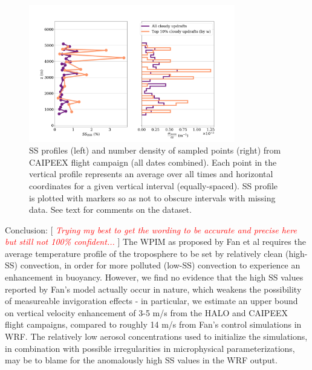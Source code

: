 \documentclass{article}
\newcommand{\klcomm}[1]{\textcolor{red}{\textit{#1}}}
\begin{document}

\begin{figure}[ht]
    \centering
    \includegraphics[width=9cm]{revcaipeex/v1_FINAL_combined_bipanel_ss_qss_vs_z_figure.png}
    \caption{SS profiles (left) and number density of sampled points (right) from CAIPEEX flight campaign (all dates combined). Each point in the vertical profile represents an average over all times and horizontal coordinates for a given vertical interval (equally-spaced). SS profile is plotted with markers so as not to obscure intervals with missing data. See text for comments on the dataset.}
    \label{caipeexbipanel}
\end{figure}

Conclusion: [ \klcomm{Trying my best to get the wording to be accurate and precise here but still not 100\% confident...} ] The WPIM as proposed by Fan et al requires the average temperature profile of the troposphere to be set by relatively clean (high-SS) convection, in order for more polluted (low-SS) convection to experience an enhancement in buoyancy. However, we find no evidence that the high SS values reported by Fan's model actually occur in nature, which weakens the possibility of measureable invigoration effects - in particular, we estimate an upper bound on vertical velocity enhancement of 3-5 m/s from the HALO and CAIPEEX flight campaigns, compared to roughly 14 m/s from Fan's control simulations in WRF. The relatively low aerosol concentrations used to initialize the simulations, in combination with possible irregularities in microphysical parameterizations, may be to blame for the anomalously high SS values in the WRF output.
\end{document}
